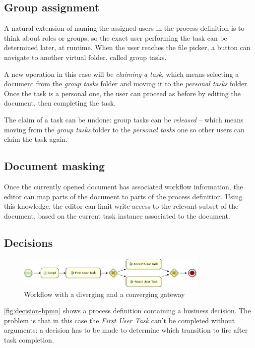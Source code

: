 \subsection*{Group assignment}

A natural extension of naming the assigned users in the process definition is
to think about roles or groups, so the exact user performing the task can be
determined later, at runtime. When the user reaches the file picker, a button
can navigate to another virtual folder, called group tasks.

A new operation in this case will be \emph{claiming a task}, which means
selecting a document from the \emph{group tasks} folder and moving it to the
\emph{personal tasks} folder. Once the task is a personal one, the user can
proceed as before by editing the document, then completing the task.

The claim of a task can be undone: group tasks can be \emph{released} -- which
means moving from the \emph{group tasks} folder to the \emph{personal tasks}
one so other users can claim the task again.

\subsection*{Document masking}

Once the currently opened document has associated workflow information, the
editor can map parts of the document to parts of the process definition. Using
this knowledge, the editor can limit write access to the relevant subset of the
document, based on the current task instance associated to the document.

\subsection*{Decisions}

\begin{figure}[H]
\centering
\includegraphics[width=350px,keepaspectratio]{decision-bpmn.png}
\caption{Workflow with a diverging and a converging gateway}
\label{fig:decision-bpmn}
\end{figure}

\autoref{fig:decision-bpmn} shows a process definition containing a business
decision. The problem is that in this case the \emph{First User Task} can't be
completed without arguments: a decision has to be made to determine which
transition to fire after task completion.

